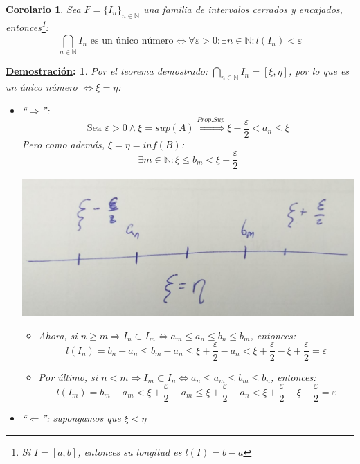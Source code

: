 \documentclass[10pt,a4paper,openright]{book}
\theoremstyle{break}
\newtheorem*{coro}{Corolario}
\newtheorem*{demo}{\underline{Demostración}:}
\begin{document}
\begin{coro}
Sea $F=\{I_n\}_{n\in \mathbb N}$ una familia de intervalos cerrados y encajados, entonces\footnote{Si $I=[a,b]$, entonces su longitud es $l(I)=b-a$}:
$$\bigcap_{n\in \mathbb N}I_n\mbox{ es un único número}\Leftrightarrow \forall \varepsilon>0: \exists n\in \mathbb N: l(I_n)<\varepsilon$$
\end{coro}
\begin{demo}
Por el teorema demostrado: $\bigcap_{n\in \mathbb N}I_n=[\xi,\eta]$, por lo que es un único número $\Leftrightarrow \xi=\eta$:

\begin{itemize}
\item ``$\Rightarrow$'':
$$\mbox{Sea }\varepsilon>0\wedge \xi=sup(A)\stackrel{Prop. Sup}{\Rightarrow} \xi-\frac{\varepsilon}{2}<a_n\leq \xi$$
Pero como además, $\xi=\eta=inf(B)$:
$$\exists m \in \mathbb N: \xi\leq b_m< \xi+ \frac{\varepsilon}{2}$$

\begin{center}
\includegraphics[scale=0.25]{corolario cantor}
\end{center}

	\begin{itemize}
	\item Ahora, si $n\geq m\Rightarrow I_n\subset I_m\Leftrightarrow a_m\leq a_n\leq b_n\leq b_m$, entonces:
$$l(I_n)=b_n-a_n\leq b_m-a_n\leq \xi+ \frac{\varepsilon}{2}-a_n<\xi+ \frac{\varepsilon}{2}-\xi+ \frac{\varepsilon}{2}=\varepsilon$$

	\item Por último, si $n<m\Rightarrow I_m\subset I_n\Leftrightarrow a_n\leq a_m\leq b_m\leq b_n$, entonces:
$$l(I_m)=b_m-a_m< \xi+\frac{\varepsilon}{2}-a_m\leq \xi+\frac{\varepsilon}{2}-a_n<\xi+\frac{\varepsilon}{2}-\xi+\frac{\varepsilon}{2}=\varepsilon$$
	\end{itemize}

\item ``$\Leftarrow$'': supongamos que $\xi<\eta$


\end{itemize}
\end{demo}
\end{document}
